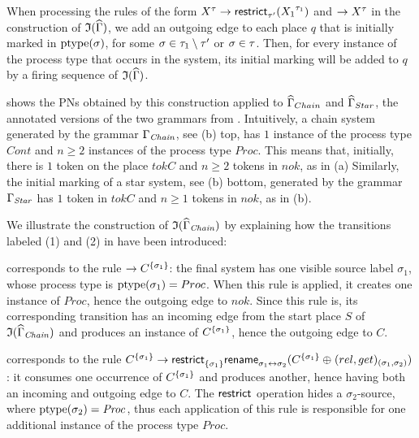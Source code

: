 When processing the rules of the form ${X}^{\tau} \rightarrow
\mathsf{restrict}^{}_{{\tau'}}({X_1}^{\tau_1})$ and $\rightarrow
{X}^{\tau}$ in the construction of
$\mathfrak{I}({\widehat{\Gamma}})$, we add an outgoing edge to each place
$q$ that is initially marked in ${\mathrm{ptype}({\sigma})}$, for some $\sigma \in
\tau_1 \setminus \tau'$ or $\sigma \in \tau$. Then, for every
instance of the process type that occurs in the system, its initial
marking will be added to $q$ by a firing sequence of
$\mathfrak{I}({\widehat{\Gamma}})$. \ifLongVersion
\begin{example}
   shows the PNs obtained by this
  construction applied to $\widehat{\Gamma}_{Chain}$ and
  $\widehat{\Gamma}_{Star}$, \ie the annotated versions of the two
  grammars from . Intuitively, a
  chain system generated by the grammar $\Gamma_\mathit{Chain}$, see
   (b) top, has $1$ instance of the process type
  $\mathit{Cont}$ and $n \geq 2$ instances of the process type
  $\mathit{Proc}$. This means that, initially, there is $1$ token on
  the place $\mathit{tokC}$ and $n\geq2$ tokens in $\mathit{nok}$, as
  in  (a) Similarly, the initial marking of
  a star system, see  (b) bottom, generated by
  the grammar $\Gamma_\mathit{Star}$ has $1$ token in
  $\mathit{tokC}$ and $n\geq1$ tokens in $\mathit{nok}$, as in
   (b).
  
  We illustrate the construction of
  $\mathfrak{I}({\widehat{\Gamma}_\mathit{Chain}})$ by explaining how the
  transitions labeled (1) and (2) in  have
  been introduced: \begin{compactenum}[(1)]
    \item corresponds to the rule $\to C^{{\{ {\sigma_1} \}}}$: the final
      system has one visible source label $\sigma_1$, whose process
      type is ${\mathrm{ptype}({\sigma_1})} = Proc$. When this rule is applied,
      it creates one instance of $Proc$, hence the outgoing edge to
      $nok$. Since this rule is, its corresponding transition has an
      incoming edge from the start place $S$ of
      $\mathfrak{I}({\widehat{\Gamma}_\mathit{Chain}})$ and produces an
      instance of $C^{\{ {\sigma_1} \}}$, hence the outgoing edge to $C$.
    \item corresponds to the rule $C^{\{ {\sigma_1} \}} \to
      \mathsf{restrict}^{}_{{{\{ {\sigma_1} \}}}} \mathsf{rename}^{}_{{\sigma_1 \leftrightarrow
        \sigma_2}} (C^{\{ {\sigma_1} \}} \oplus^{}
      (rel,get)_{(\sigma_1,\sigma_2)})$: it consumes one occurrence of
      $C^{\{ {\sigma_1} \}}$ and produces another, hence having both an
      incoming and outgoing edge to $C$.  The $\mathsf{restrict}^{}_{{}}$
      operation hides a $\sigma_2$-source, where
      ${\mathrm{ptype}({\sigma_2})}=\mathit{Proc}$, thus each application of
      this rule is responsible for one additional instance of the
      process type $Proc$.
  \end{compactenum}
\end{example}
